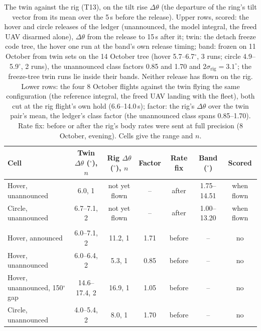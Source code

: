 \begin{table}[htbp]
  \centering
  \footnotesize
  \caption{The twin against the rig (T13), on the tilt rise $\Delta\theta$ (the departure of the ring's tilt vector from its mean over the 5\,s before the release). Upper rows, scored: the hover and circle releases of the ledger (unannounced, the model integral, the freed UAV disarmed alone), $\Delta\theta$ from the release to 15\,s after it; twin: the detach freeze code tree, the hover one run at the band's own release timing; band: frozen on 11 October from twin sets on the 14 October tree (hover 5.7--6.7$^\circ$, 3 runs; circle 4.9--5.9$^\circ$, 2 runs), the unannounced class factors 0.85 and 1.70 and $2\sigma_\mathrm{rig} = 3.1^\circ$; the freeze-tree twin runs lie inside their bands. Neither release has flown on the rig. Lower rows: the four 8 October flights against the twin flying the same configuration (the reference integral, the freed UAV landing with the fleet), both cut at the rig flight's own hold (6.6--14.0\,s); factor: the rig's $\Delta\theta$ over the twin pair's mean, the ledger's class factor (the unannounced class spans 0.85--1.70). Rate fix: before or after the rig's body rates were sent at full precision (8 October, evening). Cells give the range and $n$.}
  \label{tab:T13}
  \begin{tabularx}{\textwidth}{>{\raggedright\arraybackslash}Xcccccc}
    \toprule
    Cell & Twin $\Delta\theta$ ($^\circ$), $n$ & Rig $\Delta\theta$ ($^\circ$), $n$ & Factor & Rate fix & Band ($^\circ$) & Scored \\
    \midrule
    Hover, unannounced & 6.0, 1 & not yet flown & -- & after & 1.75--14.51 & when flown \\
    Circle, unannounced & 6.7--7.1, 2 & not yet flown & -- & after & 1.00--13.20 & when flown \\
    \midrule
    \multicolumn{7}{l}{\emph{8 October pairs (agreement, not scored)}} \\
    Hover, announced & 6.0--7.1, 2 & 11.2, 1 & 1.71 & before & -- & no \\
    Hover, unannounced & 6.0--6.4, 2 & 5.3, 1 & 0.85 & before & -- & no \\
    Hover, unannounced, 150$^\circ$ gap & 14.6--17.4, 2 & 16.9, 1 & 1.05 & before & -- & no \\
    Circle, unannounced & 4.0--5.4, 2 & 8.0, 1 & 1.70 & before & -- & no \\
    \bottomrule
  \end{tabularx}
\end{table}
